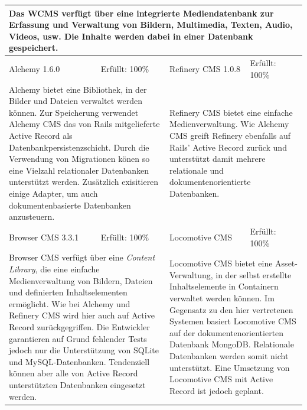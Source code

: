 \begin{tabular}[!ht]{|l|l|l|l|}
\hline
\multicolumn{4}{|p{15cm}|}{\textbf{Das WCMS verfügt über eine integrierte Mediendatenbank zur Erfassung und Verwaltung von Bildern, Multimedia, Texten, Audio, Videos, usw. Die Inhalte werden dabei in einer Datenbank gespeichert.}} \\
\hline
  Alchemy 1.6.0 & \cellcolor{green}Erfüllt: 100\% & Refinery CMS 1.0.8 & \cellcolor{green}Erfüllt: 100\% \\
  \hline
  \multicolumn{2}{|p{7.5cm}|}{Alchemy bietet eine Bibliothek, in der Bilder und Dateien verwaltet werden können. Zur Speicherung verwendet Alchemy CMS das von Rails mitgelieferte Active Record als Datenbankpersistenzschicht. Durch die Verwendung von Migrationen könen so eine Vielzahl relationaler Datenbanken unterstützt werden. Zusätzlich exisitieren einige Adapter, um auch dokumentenbasierte Datenbanken anzusteuern.}
   & \multicolumn{2}{p{7.5cm}|}{Refinery CMS bietet eine einfache Medienverwaltung. Wie Alchemy CMS greift Refinery ebenfalls auf Rails' Active Record zurück und unterstützt damit mehrere relationale und dokumentenorientierte Datenbanken.} \\
  \hline
  Browser CMS 3.3.1 & \cellcolor{green}Erfüllt: 100\% & Locomotive CMS & \cellcolor{green}Erfüllt: 100\% \\
  \hline
  \multicolumn{2}{|p{7.5cm}|}{Browser CMS verfügt über eine \emph {Content Library}, die eine einfache Medienverwaltung von Bildern, Dateien und definierten Inhaltselementen ermöglicht. Wie bei Alchemy und Refinery CMS wird hier auch auf Active Record zurückgegriffen. Die Entwickler garantieren auf Grund fehlender Tests jedoch nur die Unterstützung von SQLite und MySQL-Datenbanken. Tendenziell können aber alle von Active Record unterstützten Datenbanken eingesetzt werden.} & \multicolumn{2}{p{7.5cm}|}{Locomotive CMS bietet eine Asset-Verwaltung, in der selbst erstellte Inhaltselemente in Containern verwaltet werden können. Im Gegensatz zu den hier vertretenen Systemen basiert Locomotive CMS auf der dokumentenorientierten Datenbank MongoDB. Relationale Datenbanken werden somit nicht unterstützt. Eine Umsetzung von Locomotive CMS mit Active Record ist jedoch geplant.} \\
\hline
\end{tabular}
\newline
\newline
\newline

